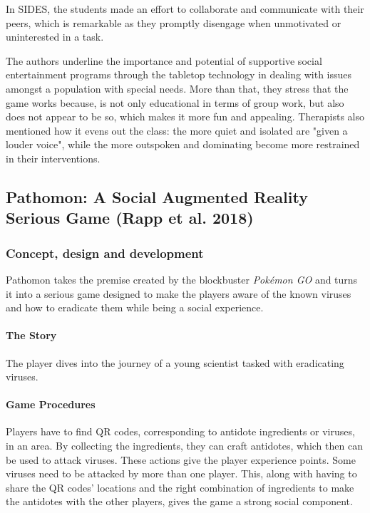 \documentclass[runningheads]{llncs}
\begin{document}
\bigskip
\par In SIDES, the students made an effort to collaborate and communicate with their peers, which is remarkable as they promptly disengage when unmotivated or uninterested in a task.
\par The authors underline the importance and potential of supportive social entertainment programs through the tabletop technology in dealing with issues amongst a population with special needs. More than that, they stress that the game works because, is not only educational in terms of group work, but also does not appear to be so, which makes it more fun and appealing. Therapists also mentioned how it evens out the class: the more quiet and isolated are "given a louder voice", while the more outspoken and dominating become more restrained in their interventions.



\newpage
\subsection{Pathomon: A Social Augmented Reality Serious Game (Rapp et al. 2018)}

\subsubsection{Concept, design and development}
\par Pathomon takes the premise created by the blockbuster \textit{Pokémon GO} and turns it into a serious game designed to make the players aware of the known viruses and how to eradicate them while being a social experience.

\paragraph{The Story} The player dives into the journey of a young scientist tasked with eradicating viruses.

\paragraph{Game Procedures} Players have to find QR codes, corresponding to antidote ingredients or viruses, in an area. By collecting the ingredients, they can craft antidotes, which then can be used to attack viruses. These actions give the player experience points. Some viruses need to be attacked by more than one player. This, along with having to share the QR codes' locations and the right combination of ingredients to make the antidotes with the other players, gives the game a strong social component.
\end{document}
